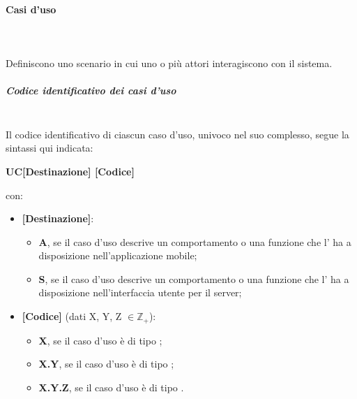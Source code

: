 \paragraph{Casi d'uso}\mbox{}\\ \\
Definiscono uno scenario in cui uno o più attori interagiscono con il sistema.
\subparagraph*{Codice identificativo dei casi d'uso}\mbox{}\\
Il codice identificativo di ciascun caso d’uso, univoco nel suo complesso, segue la sintassi qui indicata:
\begin{center}
	\textbf{UC[Destinazione] [Codice]}
\end{center}
con:
\begin{itemize}
	\item \textbf{[Destinazione]}:
		\begin{itemize}
			\item \textbf{A}, se il caso d’uso descrive un comportamento o una funzione che l’ ha a disposizione nell'applicazione mobile;
			\item \textbf{S}, se il caso d’uso descrive un comportamento o una funzione che l' ha a disposizione nell'interfaccia utente per il server;
		\end{itemize}
	\item \textbf{[Codice]} (dati X, Y, Z $\in \mathbb{Z_+}$):
	\begin{itemize}
		\item \textbf{X}, se il caso d'uso è di tipo ;
		\item \textbf{X.Y}, se il caso d'uso è di tipo ;
		\item \textbf{X.Y.Z}, se il caso d'uso è di tipo .
	\end{itemize}
\end{itemize}


